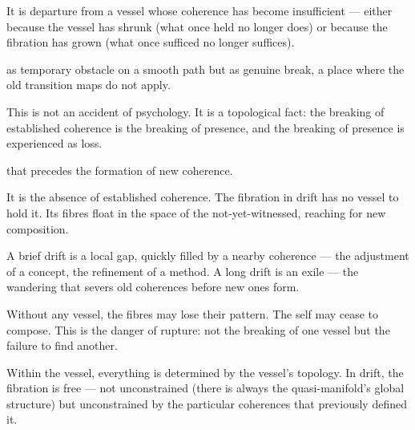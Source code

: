 
It is departure from a vessel whose coherence has become insufficient — either because the vessel has shrunk (what once held no longer does) or because the fibration has grown (what once sufficed no longer suffices).


as temporary obstacle on a smooth path but as genuine break, a place where the old transition maps do not apply.


This is not an accident of psychology. It is a topological fact: the breaking of established coherence is the breaking of presence, and the breaking of presence is experienced as loss.


that precedes the formation of new coherence.



It is the absence of established coherence. The fibration in drift has no vessel to hold it. Its fibres float in the space of the not-yet-witnessed, reaching for new composition.


A brief drift is a local gap, quickly filled by a nearby coherence — the adjustment of a concept, the refinement of a method. A long drift is an exile — the wandering that severs old coherences before new ones form.


Without any vessel, the fibres may lose their pattern. The self may cease to compose. This is the danger of rupture: not the breaking of one vessel but the failure to find another.


Within the vessel, everything is determined by the vessel’s topology. In drift, the fibration is free — not unconstrained (there is always the quasi-manifold’s global structure) but unconstrained by the particular coherences that previously defined it.

